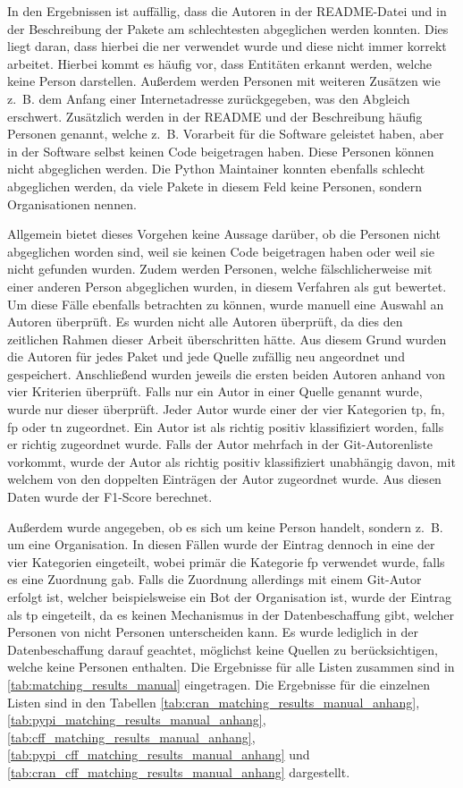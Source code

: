 In den Ergebnissen ist auffällig, dass die Autoren in der README-Datei und in der Beschreibung der Pakete am schlechtesten abgeglichen werden konnten.
Dies liegt daran, dass hierbei die \gls{ner} verwendet wurde und diese nicht immer korrekt arbeitet.
Hierbei kommt es häufig vor, dass Entitäten erkannt werden, welche keine Person darstellen.
Außerdem werden Personen mit weiteren Zusätzen wie z.~B. dem Anfang einer Internetadresse zurückgegeben, was den Abgleich erschwert.
Zusätzlich werden in der README und der Beschreibung häufig Personen genannt, welche z.~B. Vorarbeit für die Software geleistet haben, aber in der Software selbst keinen Code beigetragen haben.
Diese Personen können nicht abgeglichen werden.
Die Python Maintainer konnten ebenfalls schlecht abgeglichen werden, da viele Pakete in diesem Feld keine Personen, sondern Organisationen nennen.

Allgemein bietet dieses Vorgehen keine Aussage darüber, ob die Personen nicht abgeglichen worden sind, weil sie keinen Code beigetragen haben oder weil sie nicht gefunden wurden.
Zudem werden Personen, welche fälschlicherweise mit einer anderen Person abgeglichen wurden, in diesem Verfahren als gut bewertet.
Um diese Fälle ebenfalls betrachten zu können, wurde manuell eine Auswahl an Autoren überprüft.
Es wurden nicht alle Autoren überprüft, da dies den zeitlichen Rahmen dieser Arbeit überschritten hätte.
Aus diesem Grund wurden die Autoren für jedes Paket und jede Quelle zufällig neu angeordnet und gespeichert.
Anschließend wurden jeweils die ersten beiden Autoren anhand von vier Kriterien überprüft.
Falls nur ein Autor in einer Quelle genannt wurde, wurde nur dieser überprüft.
Jeder Autor wurde einer der vier Kategorien \gls{tp}, \gls{fn}, \gls{fp} oder \gls{tn} zugeordnet.
Ein Autor ist als richtig positiv klassifiziert worden, falls er richtig zugeordnet wurde.
Falls der Autor mehrfach in der Git-Autorenliste vorkommt, wurde der Autor als richtig positiv klassifiziert unabhängig davon, mit welchem von den doppelten Einträgen der Autor zugeordnet wurde.
Aus diesen Daten wurde der F1-Score berechnet.

Außerdem wurde angegeben, ob es sich um keine Person handelt, sondern z.~B. um eine Organisation.
In diesen Fällen wurde der Eintrag dennoch in eine der vier Kategorien eingeteilt, wobei primär die Kategorie \gls{fp} verwendet wurde, falls es eine Zuordnung gab.
Falls die Zuordnung allerdings mit einem Git-Autor erfolgt ist, welcher beispielsweise ein Bot der Organisation ist, wurde der Eintrag als \gls{tp} eingeteilt, da es keinen Mechanismus in der Datenbeschaffung gibt, welcher Personen von nicht Personen unterscheiden kann.
Es wurde lediglich in der Datenbeschaffung darauf geachtet, möglichst keine Quellen zu berücksichtigen, welche keine Personen enthalten.
Die Ergebnisse für alle Listen zusammen sind in \autoref{tab:matching_results_manual} eingetragen.
Die Ergebnisse für die einzelnen Listen sind in den Tabellen \ref{tab:cran_matching_results_manual_anhang}, \ref{tab:pypi_matching_results_manual_anhang}, \ref{tab:cff_matching_results_manual_anhang}, \ref{tab:pypi_cff_matching_results_manual_anhang} und \ref{tab:cran_cff_matching_results_manual_anhang} dargestellt.

